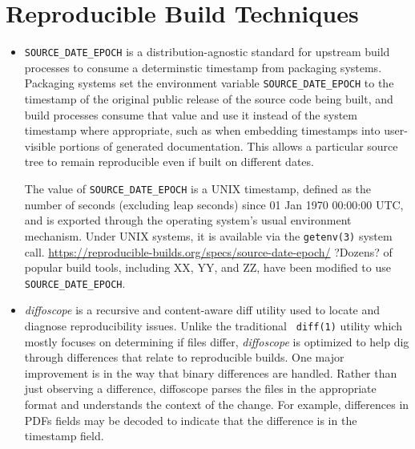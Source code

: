 \section{Reproducible Build Techniques}
\label{SEC:techniques}


\begin{itemize}

\item {\tt SOURCE\_DATE\_EPOCH} is a distribution-agnostic standard for
upstream build processes to consume a determinstic timestamp from packaging
systems.
Packaging systems set the environment variable \texttt{SOURCE\_DATE\_EPOCH} to the timestamp of the original public release of the source code being built,
and build processes consume that value and use it instead of the system timestamp where appropriate,
such as when embedding timestamps into user-visible portions of generated documentation.
This allows a particular source tree  to remain reproducible even if built on different dates.

The value of {\tt SOURCE\_DATE\_EPOCH} is a UNIX timestamp, defined as the number of seconds
(excluding leap seconds) since 01 Jan 1970 00:00:00 UTC, and is exported 
through the operating system's usual environment mechanism. Under UNIX
systems, it is available via the {\tt getenv(3)} system call.  
\url{https://reproducible-builds.org/specs/source-date-epoch/}
?Dozens? of popular build tools, including XX, YY, and ZZ, have been 
modified to use {\tt SOURCE\_DATE\_EPOCH}.


\item {\em diffoscope} is a recursive and content-aware diff utility used
to locate and diagnose reproducibility issues. Unlike the traditional {\tt
diff(1)} utility which mostly focuses on determining if files differ, 
{\em diffoscope} is optimized to help dig through differences that relate 
to reproducible builds.  One major improvement is in the way that binary
differences are handled.  Rather than just observing a difference,
diffoscope parses the files in the appropriate format and understands the
context of the change.  For example, differences in PDFs fields may be
decoded to indicate that the difference is in the timestamp field.


\end{itemize}
